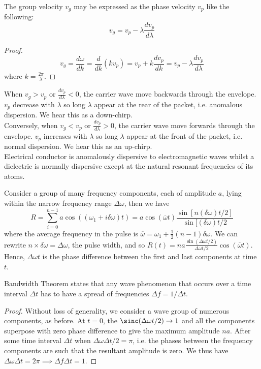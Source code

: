 \documentclass[a4paper]{article}
\begin{document}
\begin{cor}
The group velocity $v_g$ may be expressed as the phase velocity $v_p$ like the following:
$$v_g=v_p-\lambda\frac{dv_p}{d\lambda}$$
\end{cor}
\begin{proof}
$$v_g=\frac{d\omega}{d k}=\frac{d}{dk}(kv_p)=v_p+k\frac{dv_p}{dk}=v_p-\lambda\frac{dv_p}{d\lambda}$$
where $k=\frac{2\pi}{\lambda}$.
\end{proof}
\begin{eg}
When $v_g>v_p$ or $\frac{dv_p}{d\lambda}<0$, the carrier wave move backwards through the envelope. $v_p$ decrease with $\lambda$ so long $\lambda$ appear at the rear of the packet, i.e. anomalous dispersion. We hear this as a down-chirp.\\[5pt]
Conversely, when $v_g<v_p$ or $\frac{dv_p}{d\lambda}>0$, the carrier wave move forwards through the envelope. $v_p$ increases with $\lambda$ so long $\lambda$ appear at the front of the packet, i.e. normal dispersion. We hear this as an up-chirp.\\[5pt]
Electrical conductor is anomalously dispersive to electromagnetic waves whilst a dielectric is normally dispersive except at the natural resonant frequencies of its atoms.
\end{eg}
\begin{eg}
Consider a group of many frequency components, each of amplitude $a$, lying within the narrow frequency range $\Delta\omega$, then we have
$$R=\sum_{i=0}^{n-1}a\cos((\omega_1 +i\delta\omega)t)=a\cos(\overline{\omega}t)\frac{\sin[n(\delta\omega)t/2]}{\sin[(\delta\omega)t/2}$$
where the average frequency in the pulse is $\overline{\omega}=\omega_1+\frac{1}{2}(n-1)\delta\omega$. We can rewrite $n\times\delta\omega=\Delta\omega$, the pulse width, and so $R(t)=na\frac{\sin(\Delta\omega t/2)}{\Delta\omega t/2}\cos(\overline{\omega}t)$. Hence, $\Delta\omega t$ is the phase difference between the first and last components at time $t$.
\end{eg}
\begin{thm}
Bandwidth Theorem states that any wave phenomenon that occurs over a time interval $\Delta t$ has to have a spread of frequencies $\Delta f=1/\Delta t$.
\end{thm}
\begin{proof}
Without loss of generality, we consider a wave group of numerous components, as before. At $t=0$, the $\sinc(\Delta\omega t/2)\rightarrow1$ and all the components superpose with zero phase difference to give the maximum amplitude $na$. After some time interval $\Delta t$ when $\Delta\omega\Delta t/2=\pi$, i.e. the phases between the frequency components are such that the resultant amplitude is zero. We thus have $\Delta\omega\Delta t=2\pi\implies\Delta f\Delta t=1$.
\end{proof}
\end{document}
